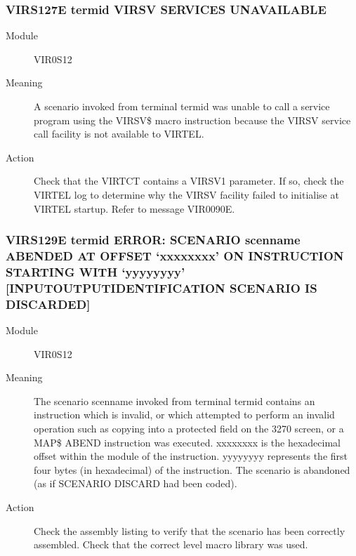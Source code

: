 \documentclass[letterpaper,10pt,english]{sphinxmanual}
\begin{document}
\subsubsection{VIRS127E termid VIRSV SERVICES UNAVAILABLE}
\label{\detokenize{messages:virs127e-termid-virsv-services-unavailable}}\begin{description}
\item[{Module}] \leavevmode
VIR0S12

\item[{Meaning}] \leavevmode
A scenario invoked from terminal termid was unable to call a service program using the VIRSV\$ macro instruction because the VIRSV service call facility is not available to VIRTEL.

\item[{Action}] \leavevmode
Check that the VIRTCT contains a VIRSV1 parameter. If so, check the VIRTEL log to determine why the VIRSV facility failed to initialise at VIRTEL startup. Refer to message VIR0090E.

\end{description}


\subsubsection{VIRS129E termid ERROR: SCENARIO scenname ABENDED AT OFFSET ‘xxxxxxxx’ ON INSTRUCTION STARTING WITH ‘yyyyyyyy’ {[}INPUT\textbar{}OUTPUT\textbar{}IDENTIFICATION SCENARIO IS DISCARDED{]}}
\label{\detokenize{messages:virs129e-termid-error-scenario-scenname-abended-at-offset-xxxxxxxx-on-instruction-starting-with-yyyyyyyy-input-output-identification-scenario-is-discarded}}\begin{description}
\item[{Module}] \leavevmode
VIR0S12

\item[{Meaning}] \leavevmode
The scenario scenname invoked from terminal termid contains an instruction which is invalid, or which attempted to perform an invalid operation such as copying into a protected field on the 3270 screen, or a MAP\$ ABEND instruction was executed. xxxxxxxx is the hexadecimal offset within the module of the instruction. yyyyyyyy represents the first four bytes (in hexadecimal) of the instruction. The scenario is abandoned (as if SCENARIO DISCARD had been coded).

\item[{Action}] \leavevmode
Check the assembly listing to verify that the scenario has been correctly assembled. Check that the correct level macro library was used.

\end{description}
\end{document}
